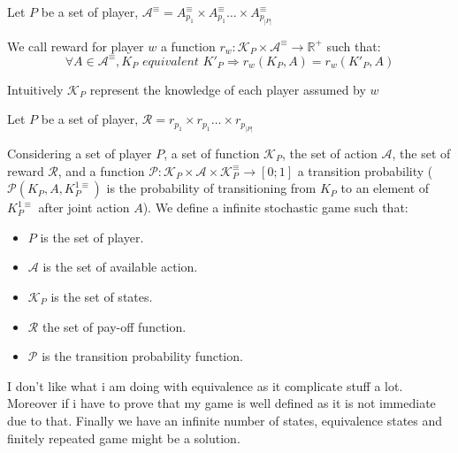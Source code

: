 \begin{mydef}
	Let $P$ be a set of player, $\mathcal{A}^\equiv = A_{p_1}^\equiv \times A_{p_1}^\equiv \ldots \times A_{p_{|P|}}^\equiv$
\end{mydef}

\begin{mydef}
	We call reward for player $w$ a function $r_w : \mathcal{K}_P \times \mathcal{A}^\equiv \rightarrow \mathbb{R}^+$ 
	such that: $$ \forall A \in \mathcal{A}^\equiv, K_P \textit{ equivalent } K'_P \Rightarrow r_w(K_P,A) = r_w(K'_P,A) $$
\end{mydef}
Intuitively $\mathcal{K}_P$ represent the knowledge of each player assumed by $w$

\begin{mydef}
	Let $P$ be a set of player, $\mathcal{R} = r_{p_1} \times r_{p_1} \ldots \times r_{p_{|P|}}$
\end{mydef}



\begin{mydef}
	Considering a set of player $P$, a set of function $\mathcal{K}_P$, the set of action $\mathcal{A}$, the set of reward $\mathcal{R}$, and a function $\mathcal{P} : \mathcal{K}_P \times \mathcal{A} \times \mathcal{K}_P^\equiv \rightarrow [0;1]$ a transition probability ($\mathcal{P}(K_P,A,K_P^{1\equiv})$ is the probability of transitioning from $K_P$ to an element of $K_P^{1\equiv}$ after joint action $A$).
	We define a infinite stochastic game  such that:
	\begin{itemize}
		\item $P$ is the set of player.
		\item $\mathcal{A}$ is the set of available action.
		\item $\mathcal{K}_P$ is the set of states.
		\item $\mathcal{R}$ the set of pay-off function.
		\item $\mathcal{P}$ is the transition probability function.
	\end{itemize}
\end{mydef}

\begin{myrem}
	I don't like what i am doing with equivalence as it complicate stuff a lot. Moreover if i have to prove that my game is well defined as it is not immediate due to that. Finally we have an infinite number of states, equivalence states and finitely repeated game might be a solution.
\end{myrem}


